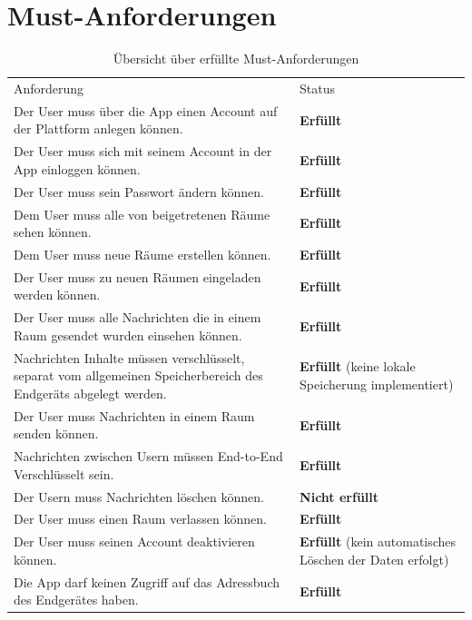     \newpage
    \section{Must-Anforderungen}\label{sec:must-anforderungen}
    \begin{table}[h]
        \centering
        \begin{tabular}{p{}|p{}}
            Anforderung & Status\\
            \cline{1-2}
            Der User muss über die App einen Account auf der Plattform anlegen können.
            &  \textbf{Erfüllt} \\
            \cline{1-2}
            Der User muss sich mit seinem Account in der App einloggen können. &  \textbf{Erfüllt} \\
            \cline{1-2}
            Der User muss sein Passwort ändern können. & \textbf{Erfüllt}  \\
            \cline{1-2}
            Dem User muss alle von beigetretenen Räume sehen können. &  \textbf{Erfüllt} \\
            \cline{1-2}
            Dem User muss neue Räume erstellen können. & \textbf{Erfüllt} \\
            \cline{1-2}
            Der User muss zu neuen Räumen eingeladen werden können. & \textbf{Erfüllt} \\
            \cline{1-2}
            Der User muss alle Nachrichten die in einem Raum gesendet wurden einsehen können. & \textbf{Erfüllt} \\
            \cline{1-2}
            Nachrichten Inhalte müssen verschlüsselt, separat vom allgemeinen Speicherbereich des Endgeräts abgelegt werden. & \textbf{Erfüllt} (keine lokale Speicherung implementiert) \\
            \cline{1-2}
            Der User muss Nachrichten in einem Raum senden können. & \textbf{Erfüllt} \\
            \cline{1-2}
            Nachrichten zwischen Usern müssen End-to-End Verschlüsselt sein. & \textbf{Erfüllt} \\
            \cline{1-2}
            Der Usern muss Nachrichten löschen können. & \textbf{Nicht erfüllt} \\
            \cline{1-2}
            Der User muss einen Raum verlassen können. & \textbf{Erfüllt} \\
            \cline{1-2}
            Der User muss seinen Account deaktivieren können. & \textbf{Erfüllt} (kein automatisches Löschen der Daten erfolgt)\\
            \cline{1-2}
            Die App darf keinen Zugriff auf das Adressbuch des Endgerätes haben. & \textbf{Erfüllt}
        \end{tabular}
        \caption{Übersicht über erfüllte Must-Anforderungen}
        \label{tab:erfüllte-must-anforderungen}
    \end{table}

